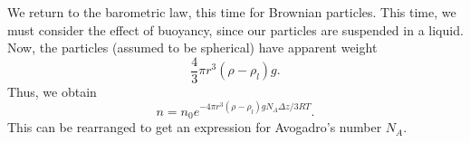 \documentclass[11pt]{article}
\theoremstyle{definition}
\theoremstyle{remark}
\numberwithin{equation}{section}
\begin{document}
    We return to the barometric law, this time for Brownian particles. This time, we
    must consider the effect of buoyancy, since our particles are suspended in a
    liquid. Now, the particles (assumed to be spherical) have apparent weight \[
        \frac{4}{3}\pi r^3(\rho - \rho_{l})g.
    \] Thus, we obtain \[
        n = n_0 e^{-4\pi r^3(\rho - \rho_l)gN_A\Delta z / 3R T}.
    \] This can be rearranged to get an expression for Avogadro's number $N_A$.
\end{document}
